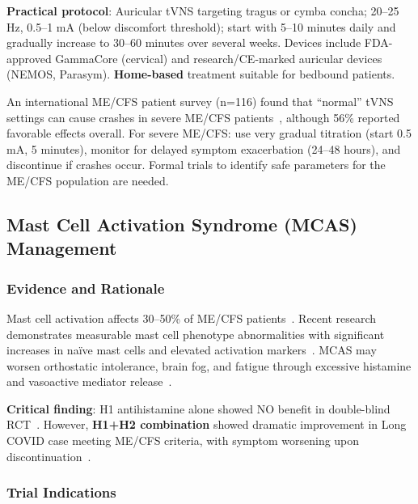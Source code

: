 \textbf{Practical protocol}: Auricular tVNS targeting tragus or cymba concha; 20--25 Hz, 0.5--1 mA (below discomfort threshold); start with 5--10 minutes daily and gradually increase to 30--60 minutes over several weeks. Devices include FDA-approved GammaCore (cervical) and research/CE-marked auricular devices (NEMOS, Parasym). \textbf{Home-based} treatment suitable for bedbound patients.

\begin{warning}
\label{warn:tvns-severe-mecfs}
An international ME/CFS patient survey (n=116) found that ``normal'' tVNS settings can cause crashes in severe ME/CFS patients~\cite{Lugg2024MECFS}, although 56\% reported favorable effects overall. For severe ME/CFS: use very gradual titration (start 0.5 mA, 5 minutes), monitor for delayed symptom exacerbation (24--48 hours), and discontinue if crashes occur. Formal trials to identify safe parameters for the ME/CFS population are needed.
\end{warning}

\subsection{Mast Cell Activation Syndrome (MCAS) Management}
\label{sec:mcas-mild-moderate}

\subsubsection{Evidence and Rationale}

Mast cell activation affects 30--50\% of ME/CFS patients~\cite{Wirth2023}. Recent research demonstrates measurable mast cell phenotype abnormalities with significant increases in naïve mast cells and elevated activation markers~\cite{Hardcastle2016}. MCAS may worsen orthostatic intolerance, brain fog, and fatigue through excessive histamine and vasoactive mediator release~\cite{Wirth2023}.

\textbf{Critical finding}: H1 antihistamine alone showed NO benefit in double-blind RCT~\cite{Steinberg1996}. However, \textbf{H1+H2 combination} showed dramatic improvement in Long COVID case meeting ME/CFS criteria, with symptom worsening upon discontinuation~\cite{Davis2023}.

\subsubsection{Trial Indications}

